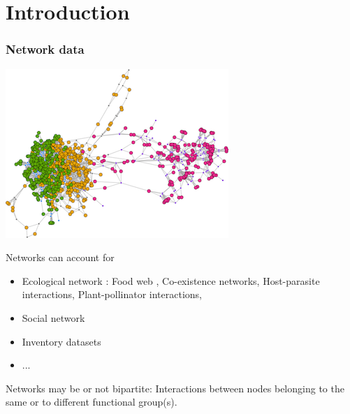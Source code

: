 \documentclass[compress,10pt]{beamer}
\begin{document}
\section{Introduction}
\begin{frame}
\frametitle{Network data}

\begin{center}
 \includegraphics[scale=.4]{plots/image_SBM.png}
\end{center}


\bigskip


Networks can account for 
\begin{itemize}
\item Ecological network : Food web , Co-existence networks, Host-parasite interactions, Plant-pollinator interactions,
\item Social network 
\item  Inventory datasets 
\item ... 
\end{itemize}

\bigskip

Networks may be or not bipartite: Interactions between nodes belonging to the same or to different functional group(s).


\end{frame}
\end{document}

